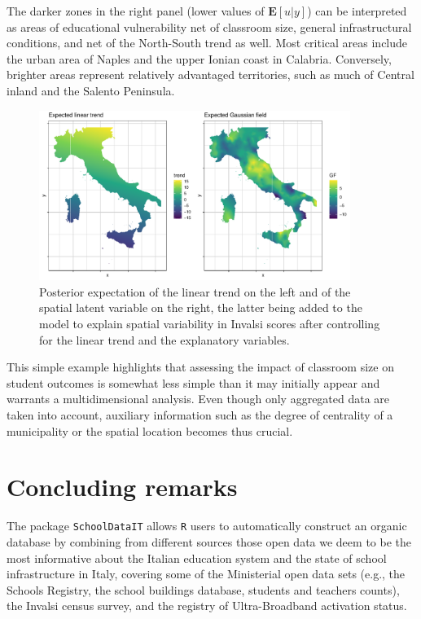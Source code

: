 \documentclass{book}
\begin{document}
The darker zones in the right panel (lower values of $\mathbf{E}[u|y]$) can be interpreted as areas of educational vulnerability net of classroom size, general infrastructural conditions, and net of the North-South trend as well. Most critical areas include the urban area of Naples and the upper Ionian coast in Calabria. Conversely, brighter areas represent relatively advantaged territories, such as much of  Central inland and the Salento Peninsula.

\begin{figure}
  \centering
  \includegraphics[width = 0.9\textwidth]{SchoolDataIT/Fig8.pdf} 
  \caption{Posterior expectation of the linear trend on the left and of the spatial latent variable on the right, the latter being added to the model to explain spatial variability in Invalsi scores after controlling for the linear trend and the explanatory variables.}
  \label{fig:trends}
\end{figure}


This simple example highlights that assessing the impact of classroom size on student outcomes is somewhat less simple than it may initially appear and warrants a multidimensional analysis. Even though only aggregated data are taken into account, auxiliary information such as the degree of centrality of a municipality or the spatial location becomes thus crucial.





\section{Concluding remarks}
The package \texttt{SchoolDataIT} allows \texttt{R} users to automatically construct an organic database by combining from different sources those open data we deem to be the most informative about the Italian education system and the state of school infrastructure in Italy, covering some of the Ministerial open data sets (e.g., the Schools Registry, the school buildings database, students and teachers counts), the Invalsi census survey, and the registry of Ultra-Broadband activation status. 
\end{document}
